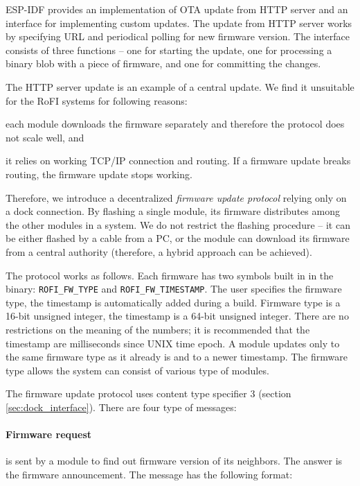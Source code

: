 ESP-IDF provides an implementation of OTA update from HTTP server and an
interface for implementing custom updates. The update from HTTP server works by
specifying URL and periodical polling for new firmware version. The interface
consists of three functions -- one for starting the update, one for processing a
binary blob with a piece of firmware, and one for committing the changes.

The HTTP server update is an example of a central update. We find it unsuitable
for the RoFI systems for following reasons:
\begin{enumerate*}
    \item each module downloads the firmware separately and therefore the
    protocol does not scale well, and
    \item it relies on working TCP/IP connection and routing. If a firmware
    update breaks routing, the firmware update stops working.
\end{enumerate*}
Therefore, we introduce a decentralized \emph{firmware update protocol} relying
only on a dock connection. By flashing a single module, its firmware distributes
among the other modules in a system. We do not restrict the flashing procedure
-- it can be either flashed by a cable from a PC, or the module can download its
firmware from a central authority (therefore, a hybrid approach can be
achieved).

The protocol works as follows. Each firmware has two symbols built in in the
binary: \texttt{ROFI\_FW\_TYPE} and \texttt{ROFI\_FW\_TIMESTAMP}. The user
specifies the firmware type, the timestamp is automatically added during a
build. Firmware type is a 16-bit unsigned integer, the timestamp is a 64-bit
unsigned integer. There are no restrictions on the meaning of the numbers; it is
recommended that the timestamp are milliseconds since UNIX time epoch. A module
updates only to the same firmware type as it already is and to a newer
timestamp. The firmware type allows the system can consist of various type of
modules.

The firmware update protocol uses content type specifier 3 (section
\ref{sec:dock_interface}). There are four type of messages:

\paragraph{Firmware request} is sent by a module to find out firmware version of
its neighbors. The answer is the firmware announcement. The message has the
following format:

